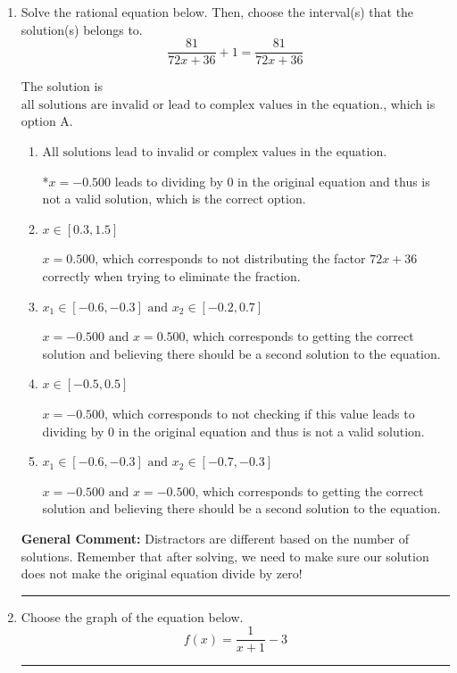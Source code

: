 \documentclass{extbook}[14pt]
\newcommand{\litem}[1]{\item #1

\rule{\textwidth}{0.4pt}}
\begin{document}
\begin{enumerate}\litem{
Solve the rational equation below. Then, choose the interval(s) that the solution(s) belongs to.
\[ \frac{81}{72x + 36} + 1 = \frac{81}{72x + 36} \]

The solution is \( \text{all solutions are invalid or lead to complex values in the equation.} \), which is option A.\begin{enumerate}[label=\Alph*.]
\item \( \text{All solutions lead to invalid or complex values in the equation.} \)

*$x = -0.500$ leads to dividing by 0 in the original equation and thus is not a valid solution, which is the correct option.
\item \( x \in [0.3,1.5] \)

$x = 0.500$, which corresponds to not distributing the factor $72x + 36$ correctly when trying to eliminate the fraction.
\item \( x_1 \in [-0.6, -0.3] \text{ and } x_2 \in [-0.2,0.7] \)

$x = -0.500 \text{ and } x = 0.500$, which corresponds to getting the correct solution and believing there should be a second solution to the equation.
\item \( x \in [-0.5,0.5] \)

$x = -0.500$, which corresponds to not checking if this value leads to dividing by 0 in the original equation and thus is not a valid solution.
\item \( x_1 \in [-0.6, -0.3] \text{ and } x_2 \in [-0.7,-0.3] \)

$x = -0.500 \text{ and } x = -0.500$, which corresponds to getting the correct solution and believing there should be a second solution to the equation.
\end{enumerate}

\textbf{General Comment:} Distractors are different based on the number of solutions. Remember that after solving, we need to make sure our solution does not make the original equation divide by zero!
}
\litem{
Choose the graph of the equation below.
\[ f(x) = \frac{1}{x + 1} - 3 \]

}
\end{enumerate}
\end{document}
